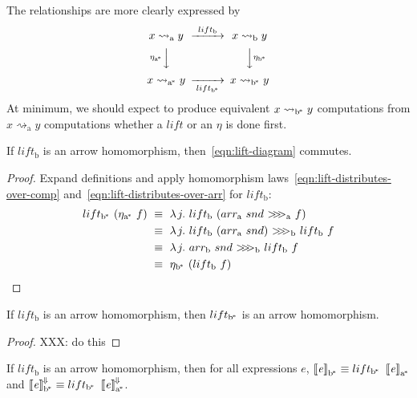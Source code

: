 \documentclass[preprint]{sigplanconf}
\newcommand{\arrow}{\rightsquigarrow}
\newcommand{\conv}{^{\mspace{-2mu}\Downarrow\mspace{-2mu}}}
\newcommand{\meaningofconv}[1]{\left\llbracket{#1}\right\rrbracket\conv}
\newcommand{\arrowlift}{\ensuremath{lift}}
\newcommand{\arrowarr}{\ensuremath{arr}}
\newcommand{\arrowcomp}{\ensuremath{{>}\mspace{-6mu}{>}\mspace{-6mu}{>}}}
\newcommand{\arrowtrans}{\ensuremath{\eta}}
\newcommand{\gen}{_\mathrm{a}}
\newcommand{\genb}{_\mathrm{b}}
\newcommand{\genc}{_\mathrm{a^{\mspace{-2mu}*}}}
\newcommand{\gend}{_\mathrm{b^{\mspace{-2mu}*}}}
\begin{document}
The relationships are more clearly expressed by
\begin{equation}
\begin{CD}
	x \arrow\gen y @>{\arrowlift\genb}>> x \arrow\genb y \\
	@V{\arrowtrans\genc}VV @VV{\arrowtrans\gend}V \\
	x \arrow\genc y @>>{\arrowlift\gend}> x \arrow\gend y
\end{CD}
\label{eqn:lift-diagram}
\end{equation}
At minimum, we should expect to produce equivalent $x \arrow\gend y$ computations from $x \arrow\gen y$ computations whether a $\arrowlift$ or an $\arrowtrans$ is done first.

\begin{theorem}
If $\arrowlift\genb$ is an arrow homomorphism, then~\eqref{eqn:lift-diagram} commutes.
\end{theorem}
\begin{proof}
Expand definitions and apply homomorphism laws~\eqref{eqn:lift-distributes-over-comp} and~\eqref{eqn:lift-distributes-over-arr} for $\arrowlift\genb$:
\begin{align*}
	\arrowlift\gend~(\arrowtrans\genc~f)
	&\ \equiv\ \fun{j}{\arrowlift\genb~(\arrowarr\gen~snd~\arrowcomp\gen~f)}
\\
	&\ \equiv\ \fun{j}{\arrowlift\genb~(\arrowarr\gen~snd)~\arrowcomp\genb~\arrowlift\genb~f}
\\
	&\ \equiv\ \fun{j}{\arrowarr\genb~snd~\arrowcomp\genb~\arrowlift\genb~f}
\\
	&\ \equiv\ \arrowtrans\gend~(\arrowlift\genb~f)
\end{align*}
\end{proof}

\begin{theorem}
If $\arrowlift\genb$ is an arrow homomorphism, then $\arrowlift\gend$ is an arrow homomorphism.
\end{theorem}
\begin{proof}
XXX: do this
\end{proof}

\begin{corollary}
If $\arrowlift\genb$ is an arrow homomorphism, then for all expressions $\mathit{e}$, $\meaningof{\mathit{e}}\gend \equiv \arrowlift\gend~\meaningof{\mathit{e}}\genc$ and $\meaningofconv{\mathit{e}}\gend \equiv \arrowlift\gend~\meaningofconv{\mathit{e}}\genc$.
\label{cor:astore-semantic-correctness}
\end{corollary}
\end{document}
